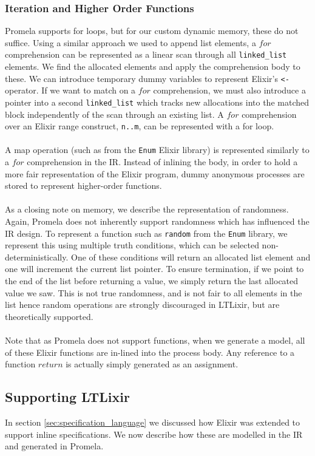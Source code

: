 \subsubsection{Iteration and Higher Order Functions}
Promela supports for loops, but for our custom dynamic memory, these do not suffice. Using a similar approach we used to append list elements, a $for$ comprehension can be represented as a linear scan through all \texttt{linked\_list} elements. We find the allocated elements and apply the comprehension body to these. We can introduce temporary dummy variables to represent Elixir's \texttt{<-} operator. If we want to match on a $for$ comprehension, we must also introduce a pointer into a second \texttt{linked\_list} which tracks new allocations into the matched block independently of the scan through an existing list. A $for$ comprehension over an Elixir range construct, \texttt{n..m}, can be represented with a for loop.
\\ \\
A map operation (such as from the \texttt{Enum} Elixir library) is represented similarly to a $for$ comprehension in the IR. Instead of inlining the body, in order to hold a more fair representation of the Elixir program, dummy anonymous processes are stored to represent higher-order functions.
\\ \\
As a closing note on memory, we describe the representation of randomness. Again, Promela does not inherently support randomness which has influenced the IR design. To represent a function such as \texttt{random} from the \texttt{Enum} library, we represent this using multiple truth conditions, which can be selected non-deterministically. One of these conditions will return an allocated list element and one will increment the current list pointer. To ensure termination, if we point to the end of the list before returning a value, we simply return the last allocated value we saw. This is not true randomness, and is not fair to all elements in the list hence random operations are strongly discouraged in LTLixir, but are theoretically supported.
\\ \\
Note that as Promela does not support functions, when we generate a model, all of these Elixir functions are in-lined into the process body. Any reference to a function $return$ is actually simply generated as an assignment.

\subsection{Supporting LTLixir} \label{sec:supporting_ltl}
In section \ref{sec:specification_language} we discussed how Elixir was extended to support inline specifications. We now describe how these are modelled in the IR and generated in Promela.
\\ \\
